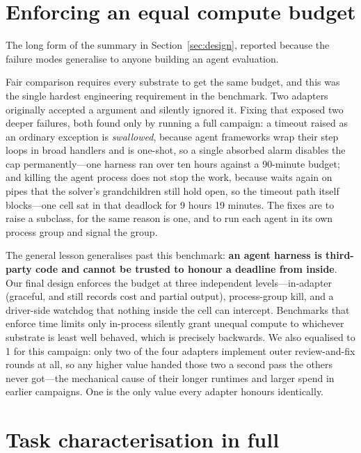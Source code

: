 \section{Enforcing an equal compute budget}
\label{app:budget}

The long form of the summary in Section~\ref{sec:design}, reported because the
failure modes generalise to anyone building an agent evaluation.

Fair comparison requires every substrate to get the same budget, and this was
the single hardest engineering requirement in the benchmark. Two adapters
originally accepted a  argument and silently ignored it.
Fixing that exposed two deeper failures, both found only by running a full
campaign: a timeout raised as an ordinary exception is \emph{swallowed}, because
agent frameworks wrap their step loops in broad  handlers
and  is one-shot, so a single absorbed alarm disables the cap
permanently---one harness ran over ten hours against a 90-minute budget; and
killing the agent process does not stop the work, because
 waits again on pipes
that the solver's grandchildren still hold open, so the timeout path itself
blocks---one cell sat in that deadlock for 9 hours 19 minutes. The fixes are to
raise a  subclass, for the same reason 
is one, and to run each agent in its own process group and signal the group.

The general lesson generalises past this benchmark: \textbf{an agent harness is
third-party code and cannot be trusted to honour a deadline from inside}. Our
final design enforces the budget at three independent levels---in-adapter
(graceful, and still records cost and partial output), process-group kill, and a
driver-side watchdog that nothing inside the cell can intercept. Benchmarks that
enforce time limits only in-process silently grant unequal compute to whichever
substrate is least well behaved, which is precisely backwards. We also equalised
 to 1 for this campaign: only two of the four adapters
implement outer review-and-fix rounds at all, so any higher value handed those
two a second pass the others never got---the mechanical cause of their longer
runtimes and larger spend in earlier campaigns. One is the only value every
adapter honours identically.

\section{Task characterisation in full}
\label{app:characterisation}

